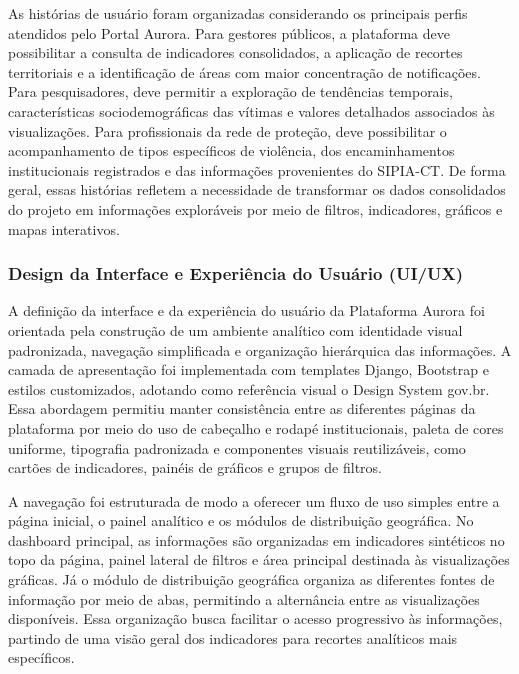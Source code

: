 \documentclass[11pt,a4paper]{article}
\begin{document}
As histórias de usuário foram organizadas considerando os principais perfis atendidos pelo Portal Aurora. Para gestores públicos, a plataforma deve possibilitar a consulta de indicadores consolidados, a aplicação de recortes territoriais e a identificação de áreas com maior concentração de notificações. Para pesquisadores, deve permitir a exploração de tendências temporais, características sociodemográficas das vítimas e valores detalhados associados às visualizações. Para profissionais da rede de proteção, deve possibilitar o acompanhamento de tipos específicos de violência, dos encaminhamentos institucionais registrados e das informações provenientes do SIPIA-CT. De forma geral, essas histórias refletem a necessidade de transformar os dados consolidados do projeto em informações exploráveis por meio de filtros, indicadores, gráficos e mapas interativos.

\subsubsection{Design da Interface e Experiência do Usuário (UI/UX)}
\label{subsubsec:design_ui_ux_meta3}

A definição da interface e da experiência do usuário da Plataforma Aurora foi orientada pela construção de um ambiente analítico com identidade visual padronizada, navegação simplificada e organização hierárquica das informações. A camada de apresentação foi implementada com templates Django, Bootstrap e estilos customizados, adotando como referência visual o Design System gov.br. Essa abordagem permitiu manter consistência entre as diferentes páginas da plataforma por meio do uso de cabeçalho e rodapé institucionais, paleta de cores uniforme, tipografia padronizada e componentes visuais reutilizáveis, como cartões de indicadores, painéis de gráficos e grupos de filtros. 

A navegação foi estruturada de modo a oferecer um fluxo de uso simples entre a página inicial, o painel analítico e os módulos de distribuição geográfica. No dashboard principal, as informações são organizadas em indicadores sintéticos no topo da página, painel lateral de filtros e área principal destinada às visualizações gráficas. Já o módulo de distribuição geográfica organiza as diferentes fontes de informação por meio de abas, permitindo a alternância entre as visualizações disponíveis. Essa organização busca facilitar o acesso progressivo às informações, partindo de uma visão geral dos indicadores para recortes analíticos mais específicos.
\end{document}

